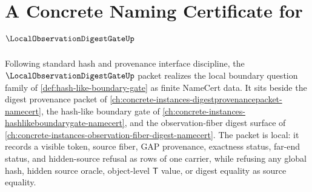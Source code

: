 \chapter{A Concrete Naming Certificate for $\LocalObservationDigestGateUp$}
\label{ch:concrete-instances-local-observation-digest-gate-namecert}

Following standard hash and provenance interface discipline, the $\LocalObservationDigestGateUp$ packet realizes the local boundary question family of \autoref{def:hash-like-boundary-gate} as finite NameCert data. It sits beside the digest provenance packet of \autoref{ch:concrete-instances-digestprovenancepacket-namecert}, the hash-like boundary gate of \autoref{ch:concrete-instances-hashlikeboundarygate-namecert}, and the observation-fiber digest surface of \autoref{ch:concrete-instances-observation-fiber-digest-namecert}. The packet is local: it records a visible token, source fiber, GAP provenance, exactness status, far-end status, and hidden-source refusal as rows of one carrier, while refusing any global hash, hidden source oracle, object-level $\mathsf{T}$ value, or digest equality as source equality.

